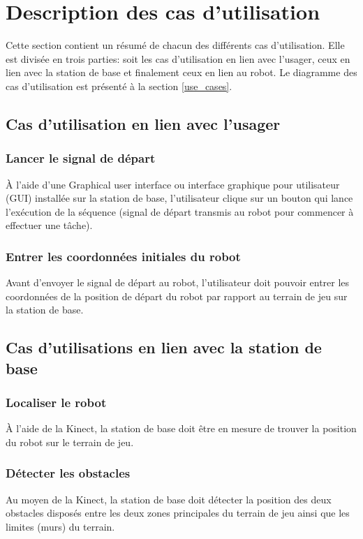 


\chapter{Description des cas d'utilisation}
\label{s:utilisation}
Cette section contient un résumé de chacun des différents cas d'utilisation. Elle est divisée en trois parties: soit les cas d'utilisation en lien avec l'usager, ceux en lien avec la station de base et finalement ceux en lien au robot. Le diagramme des cas d'utilisation est présenté à la section \ref{use_cases}.
\section{Cas d'utilisation en lien avec l'usager}
\subsection{Lancer le signal de départ}
À l'aide d'une Graphical user interface ou interface graphique pour utilisateur (GUI) installée sur la station de base, l'utilisateur clique sur un bouton qui lance l'exécution de la séquence (signal de départ transmis au robot pour commencer à effectuer une tâche).
\subsection{Entrer les coordonnées initiales du robot}
Avant d'envoyer le signal de départ au robot, l'utilisateur doit pouvoir entrer les coordonnées de la position de départ du robot par rapport au terrain de jeu sur la station de base.
\section{Cas d'utilisations en lien avec la station de base}
\subsection{Localiser le robot}
À l'aide de la Kinect, la station de base doit être en mesure de trouver la position du robot sur le terrain de jeu.
\subsection{Détecter les obstacles}
Au moyen de la Kinect, la station de base doit détecter la position des deux obstacles disposés entre les deux zones principales du terrain de jeu ainsi que les limites (murs) du terrain.
